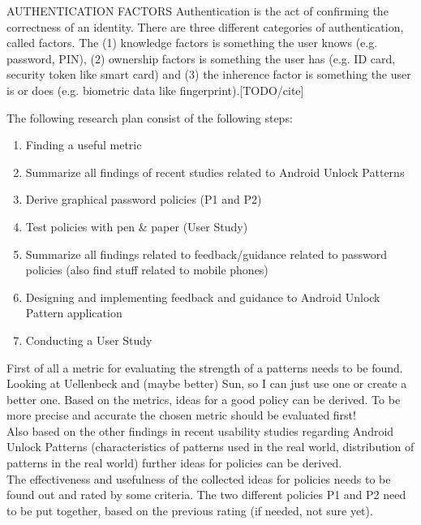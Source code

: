 AUTHENTICATION FACTORS
Authentication is the act of confirming the correctness of an identity. There are three different categories of authentication, called factors. The (1) knowledge factors is something the user knows (e.g. password, PIN), (2) ownership factors is something the user has (e.g. ID card, security token like smart card) and (3) the inherence factor is something the user is or does (e.g. biometric data like fingerprint).[TODO/cite]



The following research plan consist of the following steps:\\

\begin{enumerate}
	\item Finding a useful metric
	\item Summarize all findings of recent studies related to Android Unlock Patterns
	\item Derive graphical password policies (P1 and P2)
	\item Test policies with pen \& paper (User Study)
	\item Summarize all findings related to feedback/guidance related to password policies (also find stuff related to mobile phones)
	\item Designing and implementing feedback and guidance to Android Unlock Pattern application
	\item Conducting a User Study
\end{enumerate}

First of all a metric for evaluating the strength of a patterns needs to be found. Looking at Uellenbeck and (maybe better) Sun, so I can just use one or create a better one. Based on the metrics, ideas for a good policy can be derived. To be more precise and accurate the chosen metric should be evaluated first!\\

Also based on the other findings in recent usability studies regarding Android Unlock Patterns (characteristics of patterns used in the real world, distribution of patterns in the real world) further ideas for policies can be derived.\\

The effectiveness and usefulness of the collected ideas for policies needs to be found out and rated by some criteria. The two different policies P1 and P2 need to be put together, based on the previous rating (if needed, not sure yet).\\

